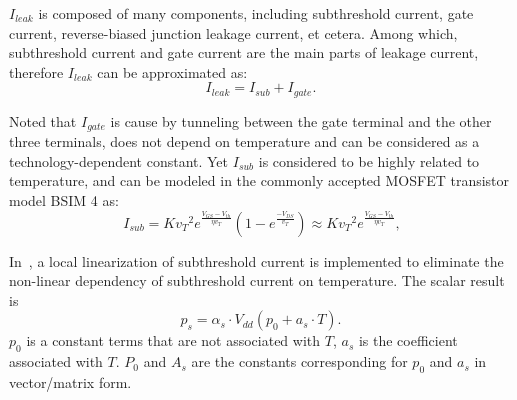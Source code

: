 $I_{leak}$ is composed of many components, including subthreshold current, gate current, reverse-biased junction leakage current, et cetera. Among which, subthreshold current and gate current are the main parts of leakage current, therefore $I_{leak}$ can be approximated as:
\begin{equation}\label{eq:leakage}
I_{leak}=I_{sub}+I_{gate}.
\end{equation}

Noted that $I_{gate}$ is cause by tunneling between the gate terminal and the other three terminals, does not depend on temperature and can be considered as a technology-dependent constant. Yet $I_{sub}$ is considered to be highly related to temperature, and can be modeled in the commonly accepted MOSFET transistor model BSIM 4 as:
\begin{equation}\label{eq:sub_current}\
I_{sub}=K {v_T}^2e^{\frac{V_{GS}-V_{th}}{\eta v_T}}
  (1-e^{\frac{-V_{DS}}{v_T}}) \approx K {v_T}^2e^{\frac{V_{GS}-V_{th}}{\eta v_T}},
\end{equation}

In~\cite{WangWan:TOC'18}, a local linearization of subthreshold current is implemented to eliminate the non-linear dependency of subthreshold current on temperature. The scalar result is
\begin{equation}\label{eq:lin_leakage}
p_{s} = \alpha_{s}\cdot V_{dd} (p_{0}+a_{s} \cdot T).
\end{equation}
$p_{0}$ is a constant terms that are not associated with $T$, $a_{s}$ is the coefficient associated with $T$. $P_{0}$ and $A_{s}$ are the constants corresponding for $p_{0}$ and $a_{s}$ in vector/matrix form.



